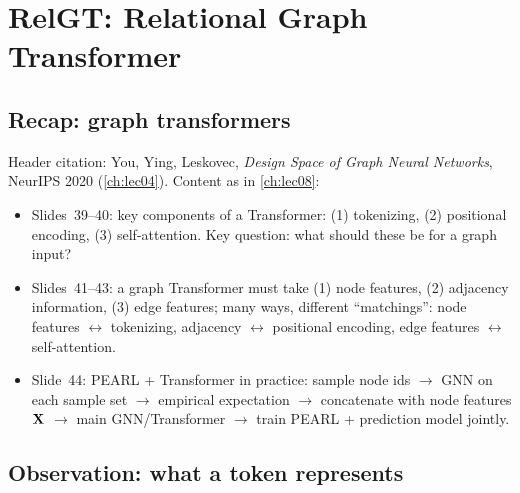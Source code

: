 \section{RelGT: Relational Graph Transformer}\label{sec:lec13-relgt}

\subsection{Recap: graph transformers}\label{sec:lec13-gtrecap}

Header citation: You, Ying, Leskovec, \emph{Design Space of Graph Neural Networks},
NeurIPS 2020 (\cref{ch:lec04}). Content as in \cref{ch:lec08}:
\begin{itemize}
  \item Slides~39--40: key components of a Transformer: (1) tokenizing, (2) positional
    encoding, (3) self-attention. Key question: what should these be for a graph input?
  \item Slides~41--43: a graph Transformer must take (1) node features, (2) adjacency
    information, (3) edge features; many ways, different ``matchings'': node features
    $\leftrightarrow$ tokenizing, adjacency $\leftrightarrow$ positional encoding, edge
    features $\leftrightarrow$ self-attention.
  \item Slide~44: PEARL + Transformer in practice: sample node ids $\to$ GNN on each
    sample set $\to$ empirical expectation $\to$ concatenate with node features $\mathbf{X}$
    $\to$ main GNN/Transformer $\to$ train PEARL + prediction model jointly.
\end{itemize}

\subsection{Observation: what a token represents}\label{sec:lec13-tokens}

